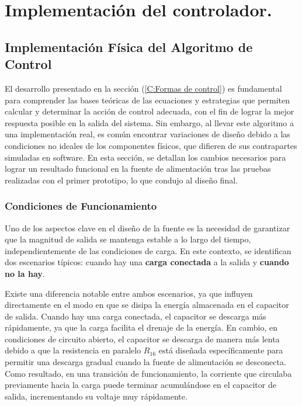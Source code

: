 \chapter{Implementación del controlador.}

\label{C:Implementación del algoritmo de control}
\section{Implementación Física del Algoritmo de Control}
El desarrollo presentado en la sección  (\ref{C:Formas de control}) es fundamental para comprender las bases teóricas de las ecuaciones y estrategias que permiten calcular y determinar la acción de control adecuada, con el fin de lograr la mejor respuesta posible en la salida del sistema. Sin embargo, al llevar este algoritmo a una implementación real, es común encontrar variaciones de diseño debido a las condiciones no ideales de los componentes físicos, que difieren de sus contrapartes simuladas en software. En esta sección, se detallan los cambios necesarios para lograr un resultado funcional en la fuente de alimentación tras las pruebas realizadas con el primer prototipo, lo que condujo al diseño final.\par

\subsection{Condiciones de Funcionamiento}
Uno de los aspectos clave en el diseño de la fuente es la necesidad de garantizar que la magnitud de salida se mantenga estable a lo largo del tiempo, independientemente de las condiciones de carga. En este contexto, se identifican dos escenarios típicos: cuando hay una \textbf{carga conectada} a la salida y \textbf{cuando no la hay}. \par
Existe una diferencia notable entre ambos escenarios, ya que influyen directamente en el modo en que se disipa la energía almacenada en el capacitor de salida. Cuando hay una carga conectada, el capacitor se descarga más rápidamente, ya que la carga facilita el drenaje de la energía. En cambio, en condiciones de circuito abierto, el capacitor se descarga de manera más lenta debido a que la resistencia en paralelo $R_{16}$ está diseñada específicamente para permitir una descarga gradual cuando la fuente de alimentación se desconecta. Como resultado, en una transición de funcionamiento, la corriente que circulaba previamente hacia la carga puede terminar acumulándose en el capacitor de salida, incrementando su voltaje muy rápidamente. \par

